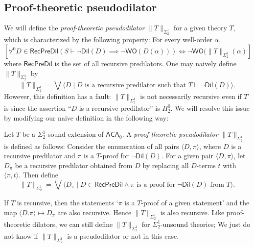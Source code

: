 \documentclass{mhkr}
\newcommand{\added}[1]{#1}
\newcommand{\lag}{\langle}
\newcommand{\rag}{\rangle}
\newcommand{\WO}{\mathsf{WO}}
\newcommand{\Dil}{\mathsf{Dil}}
\newcommand{\RecPreDil}{\mathsf{RecPreDil}}
\newcommand{\ACA}{\mathsf{ACA}}
\begin{document}
\subsection{Proof-theoretic pseudodilator}
We will define the \emph{proof-theoretic pseudodilator} $\|T\|_{\Sigma^1_2}$ for a given theory $T$, which is characterized by the following property: For every well-order $\alpha$,
\begin{equation} \label{Formula: Main property of proof-theoretic pseudodilator}
    [\forall^0 D\in \RecPreDil (S\vdash \lnot\Dil(D) \implies \lnot \WO(D(\alpha))) \iff \lnot \WO(\|T\|_{\Sigma^1_2}(\alpha)]
\end{equation}
where $\RecPreDil$ is the set of all recursive predilators. One may naively define $\|T\|_{\Sigma^1_2}$ by
\begin{equation*}
    \|T\|_{\Sigma^1_2} = {\textstyle \bigvee}\lag D \mid \text{$D$ is a recursive predilator such that } T\vdash \lnot\Dil(D)\rag.
\end{equation*}
However, this definition has a \added{fault}: $\|T\|_{\Sigma^1_2}$ is not necessarily recursive even if $T$ is \added{ since the assertion ``$D$ is a recursive predilator'' is $\Pi^0_2$}. We will resolve this issue by modifying our naive definition in the following way:

\begin{definition}
    Let $T$ be a $\Sigma^1_2$-sound extension of $\ACA_0$.
    A \emph{proof-theoretic pseudodilator} $\|T\|_{\Sigma^1_2}$ is defined as follows:
    Consider the enumeration of all pairs $\lag D, \pi\rag$, where $D$ is a recursive predilator and $\pi$ is a $T$-proof for $\lnot\Dil(D)$. For a given pair $\lag D,\pi\rag$, let $D_\pi$ be a recursive predilator obtained from $D$ by replacing all $D$-terms $t$ with $\lag \pi, t\rag$.
    Then define
    \begin{equation*}
        \|T\|_{\Sigma^1_2} = {\textstyle \bigvee}\lag D_\pi \mid D\in\RecPreDil \land \text{$\pi$ is a proof for $\lnot\Dil(D)$ from $T$}\rag.
    \end{equation*}
\end{definition}
If $T$ is recursive, then the statements `$\pi$ is a $T$-proof of a given statement' and the map $\lag D.\pi\rag\mapsto D_\pi$ are also recursive. Hence $\|T\|_{\Sigma^1_2}$ is also recursive.
Like proof-theoretic dilators, we can still define $\|T\|_{\Sigma^1_2}$ for $\Sigma^1_2$-unsound theories; We just do not know if $\|T\|_{\Sigma^1_2}$ is a pseudodilator or not in this case.
\end{document}

